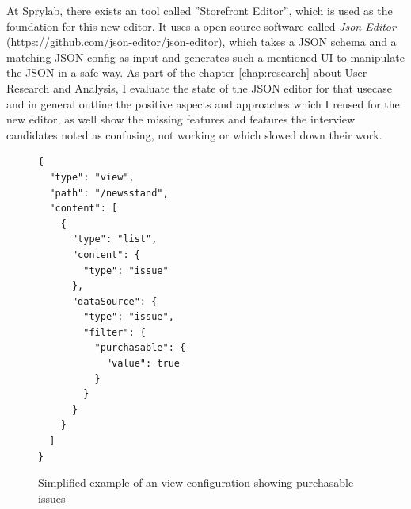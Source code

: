 At Sprylab, there exists an tool called ''Storefront Editor'', which is used as the foundation for this new editor.
It uses a open source software called \textit{Json Editor} (\url{https://github.com/json-editor/json-editor}), which takes a JSON schema and a matching JSON config as input and generates such a mentioned UI to manipulate the JSON in a safe way.
As part of the chapter \ref{chap:research} about User Research and Analysis, I evaluate the state of the JSON editor for that usecase and in general outline the positive aspects and approaches which I reused for the new editor,
as well show the missing features and features the interview candidates noted as confusing, not working or which slowed down their work.

\begin{figure}
  \lstset{language=json,basicstyle=\footnotesize,numbers=left,showstringspaces=false,frame=single}
  \begin{lstlisting}
{
  "type": "view",
  "path": "/newsstand",
  "content": [
    {
      "type": "list",
      "content": {
        "type": "issue"
      },
      "dataSource": {
        "type": "issue",
        "filter": {
          "purchasable": {
            "value": true
          }
        }
      }
    }
  ]
}
  \end{lstlisting}
  \caption{Simplified example of an view configuration showing purchasable issues}
\end{figure}